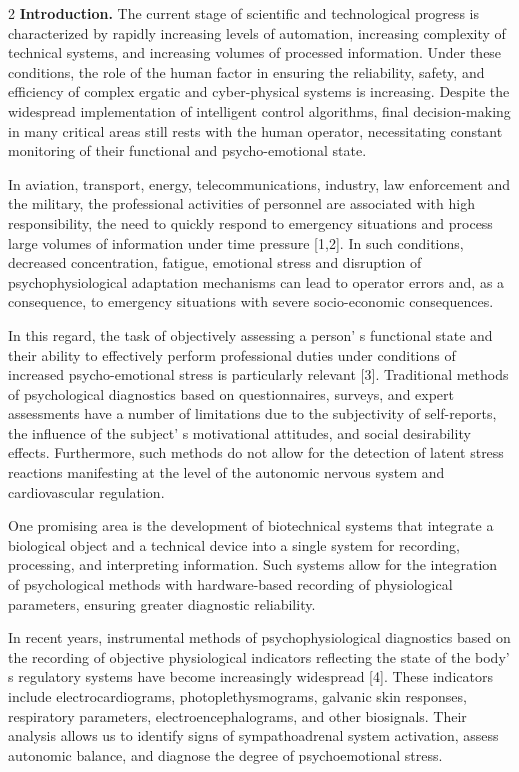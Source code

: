 \begin{multicols}{2}
{\bfseries Introduction.} The current stage of scientific and technological
progress is characterized by rapidly increasing levels of automation,
increasing complexity of technical systems, and increasing volumes of
processed information. Under these conditions, the role of the human
factor in ensuring the reliability, safety, and efficiency of complex
ergatic and cyber-physical systems is increasing. Despite the widespread
implementation of intelligent control algorithms, final decision-making
in many critical areas still rests with the human operator,
necessitating constant monitoring of their functional and
psycho-emotional state.

In aviation, transport, energy, telecommunications, industry, law
enforcement and the military, the professional activities of personnel
are associated with high responsibility, the need to quickly respond to
emergency situations and process large volumes of information under time
pressure {[}1,2{]}. In such conditions, decreased concentration,
fatigue, emotional stress and disruption of psychophysiological
adaptation mechanisms can lead to operator errors and, as a consequence,
to emergency situations with severe socio-economic consequences.

In this regard, the task of objectively assessing a
person' s functional state and their ability to
effectively perform professional duties under conditions of increased
psycho-emotional stress is particularly relevant {[}3{]}. Traditional
methods of psychological diagnostics based on questionnaires, surveys,
and expert assessments have a number of limitations due to the
subjectivity of self-reports, the influence of the
subject' s motivational attitudes, and social
desirability effects. Furthermore, such methods do not allow for the
detection of latent stress reactions manifesting at the level of the
autonomic nervous system and cardiovascular regulation.

One promising area is the development of biotechnical systems that
integrate a biological object and a technical device into a single
system for recording, processing, and interpreting information. Such
systems allow for the integration of psychological methods with
hardware-based recording of physiological parameters, ensuring greater
diagnostic reliability.

In recent years, instrumental methods of psychophysiological diagnostics
based on the recording of objective physiological indicators reflecting
the state of the body' s regulatory systems have become
increasingly widespread {[}4{]}. These indicators include
electrocardiograms, photoplethysmograms, galvanic skin responses,
respiratory parameters, electroencephalograms, and other biosignals.
Their analysis allows us to identify signs of sympathoadrenal system
activation, assess autonomic balance, and diagnose the degree of
psychoemotional stress.


\end{multicols}
